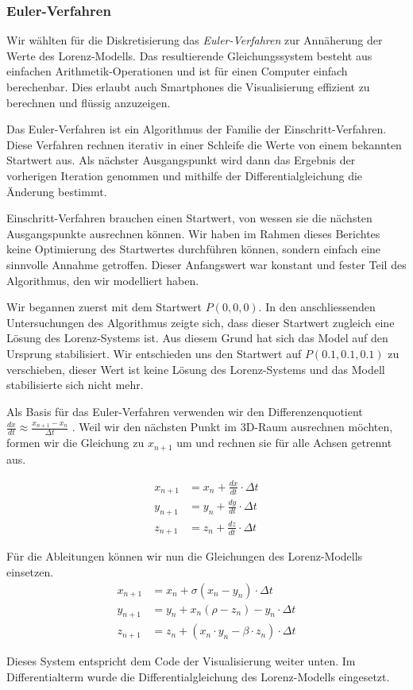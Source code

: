 \subsubsection{Euler-Verfahren} \label{euler-verfahren}

Wir wählten für die Diskretisierung das \textit{Euler-Verfahren} zur Annäherung der Werte des Lorenz-Modells. Das resultierende Gleichungssystem besteht aus einfachen Arithmetik-Operationen und ist für einen Computer einfach berechenbar. Dies erlaubt auch Smartphones die Visualisierung effizient zu berechnen und flüssig anzuzeigen.

Das Euler-Verfahren ist ein Algorithmus der Familie der Einschritt-Verfahren. Diese Verfahren rechnen iterativ in einer Schleife die Werte von einem bekannten Startwert aus. Als nächster Ausgangspunkt wird dann das Ergebnis der vorherigen Iteration genommen und mithilfe der Differentialgleichung die Änderung bestimmt. 

Einschritt-Verfahren brauchen einen Startwert, von wessen sie die nächsten Ausgangspunkte ausrechnen können. Wir haben im Rahmen dieses Berichtes keine Optimierung des Startwertes durchführen können, sondern einfach eine sinnvolle Annahme getroffen. Dieser Anfangswert war konstant und fester Teil des Algorithmus, den wir modelliert haben.

Wir begannen zuerst mit dem Startwert $ P(0, 0, 0) $. In den anschliessenden Untersuchungen des Algorithmus zeigte sich, dass dieser Startwert zugleich eine Lösung des Lorenz-Systems ist. Aus diesem Grund hat sich das Model auf den Ursprung stabilisiert. Wir entschieden uns den Startwert auf $ P(0.1, 0.1, 0.1) $ zu verschieben, dieser Wert ist keine Lösung des Lorenz-Systems und das Modell stabilisierte sich nicht mehr.

Als Basis für das Euler-Verfahren verwenden wir den Differenzenquotient $ \frac{dx}{dt} \approx \frac{x_{n + 1} - x_n}{\Delta t} $ \cite{dahmen2008}.  Weil wir den nächsten Punkt im 3D-Raum ausrechnen möchten, formen wir die Gleichung zu $ x_{n + 1} $  um und rechnen sie für alle Achsen getrennt aus.

\begin{align}
    x_{n + 1} &= x_n + \frac{dx}{dt} \cdot \Delta t\\
    y_{n + 1} &= y_n + \frac{dy}{dt} \cdot \Delta t\\
    z_{n + 1} &= z_n + \frac{dz}{dt} \cdot \Delta t
\end{align}

Für die Ableitungen können wir nun die Gleichungen des Lorenz-Modells einsetzen.
\begin{align}
    x_{n + 1} &= x_n + \sigma(x_n - y_n) \cdot \Delta t\\
    y_{n + 1} &= y_n + x_n(\rho - z_n) - y_n \cdot \Delta t\\
    z_{n + 1} &= z_n + (x_n \cdot y_n - \beta \cdot z_n) \cdot \Delta t
\end{align}

Dieses System entspricht dem Code der Visualisierung weiter unten. Im Differentialterm wurde die Differentialgleichung des Lorenz-Modells eingesetzt.
